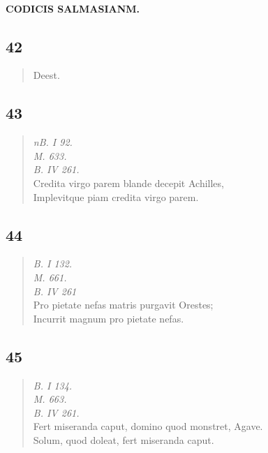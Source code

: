 \documentclass[11pt, a4paper]{report}
\begin{document}
            
        ﻿\pagebreak 
    
            \begin{center} \textbf{CODICIS SALMASIANM.} \end{center}
             \marginpar{[103]} 
            \subsection*{42}
      \begin{verse}
      Deest. \\ 
      \end{verse}
  
            \subsection*{43}
      \begin{verse}
      \textit{nB. I 92.} \\ \textit{M. 633.} \\ \textit{B. IV 261.} \\ Credita virgo parem blande decepit Achilles, \\ Implevitque piam credita virgo parem. \\ 
      \end{verse}
  
            \subsection*{44}
      \begin{verse}
      \textit{B. I 132.} \\ \textit{M. 661.} \\ \textit{B. IV 261} \\ Pro pietate nefas matris purgavit Orestes; \\ Incurrit magnum pro pietate nefas. \\ 
      \end{verse}
  
            \subsection*{45}
      \begin{verse}
      \textit{B. I 134.} \\ \textit{M. 663.} \\ \textit{B. IV 261.} \\ Fert miseranda caput, domino quod monstret, Agave. \\ Solum, quod doleat, fert miseranda caput. \\ 
      \end{verse}
  
\end{document}
